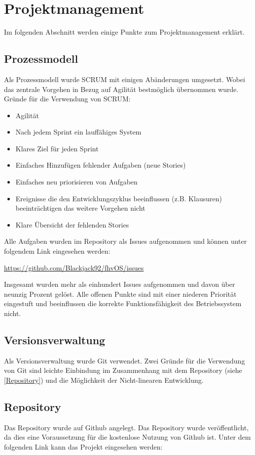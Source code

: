 \section{Projektmanagement}
Im folgenden Abschnitt werden einige Punkte zum Projektmanagement erklärt. 

\subsection{Prozessmodell}
Als Prozessmodell wurde SCRUM mit einigen Abänderungen umgesetzt. Wobei das zentrale Vorgehen in Bezug auf Agilität bestmöglich übernommen wurde. Gründe für die Verwendung von SCRUM:

\begin{itemize}
	\item Agilität
	\item Nach jedem Sprint ein lauffähiges System
	\item Klares Ziel für jeden Sprint
	\item Einfaches Hinzufügen fehlender Aufgaben (neue Stories)
	\item Einfaches neu priorisieren von Aufgaben
	\item Ereignisse die den Entwicklungszyklus beeinflussen (z.B. Klausuren) beeinträchtigen das weitere Vorgehen nicht
	\item Klare Übersicht der fehlenden Stories
\end{itemize}

Alle Aufgaben wurden im Repository als Issues aufgenommen und können unter folgendem Link eingesehen werden:

\url{https://github.com/Blackjack92/fhvOS/issues}
\linebreak

Insgesamt wurden mehr als einhundert Issues aufgenommen und davon über neunzig Prozent gelöst. Alle offenen Punkte sind mit einer niederen Priorität eingestuft und beeinflussen die korrekte Funktionsfähigkeit des Betriebssystem nicht.

\subsection{Versionsverwaltung}
Als Versionsverwaltung wurde Git verwendet. Zwei Gründe für die Verwendung von Git sind leichte Einbindung im Zusammenhang mit dem Repository (siehe \ref{Repository}) und die Möglichkeit der Nicht-linearen Entwicklung.

\subsection{Repository}
Das Repository wurde auf Github angelegt. Das Repository wurde veröffentlicht, da dies eine Voraussetzung für die kostenlose Nutzung von Github ist. Unter dem folgenden Link kann das Projekt eingesehen werden:

